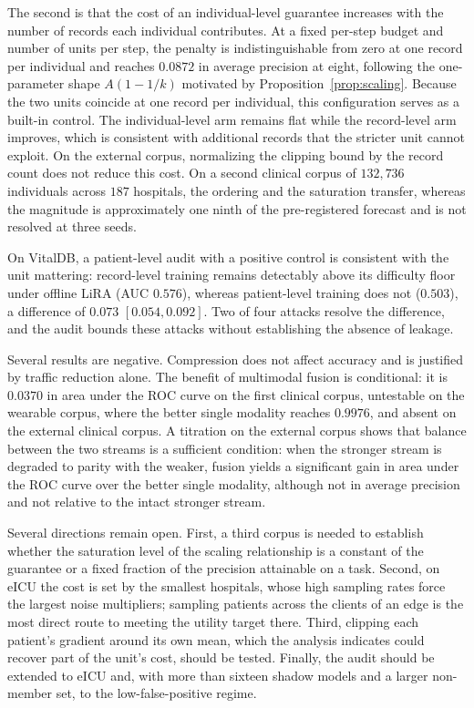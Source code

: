 The second is that the cost of an individual-level guarantee increases with the number of
records each individual contributes. At a fixed per-step budget and number of
units per step, the penalty is indistinguishable from zero at one record per
individual and reaches $0.0872$ in average precision at eight, following the
one-parameter shape $A(1 - 1/k)$ motivated by Proposition~\ref{prop:scaling}. Because the two units coincide at one record per
individual, this configuration serves as a built-in control. The
individual-level arm remains flat while the record-level arm improves, which is
consistent with additional records that the stricter unit cannot exploit.
On the external corpus, normalizing the clipping bound by the record count
does not reduce this cost. On a second clinical corpus of $132{,}736$ individuals across $187$
hospitals, the ordering and the saturation transfer, whereas the magnitude is
approximately one ninth of the pre-registered forecast and is not resolved at
three seeds.

On VitalDB, a patient-level audit with a positive control is consistent with
the unit mattering: record-level training remains detectably above its
difficulty floor under offline LiRA (AUC $0.576$), whereas patient-level
training does not ($0.503$), a difference of $0.073$ $[0.054, 0.092]$. Two of
four attacks resolve the difference, and the audit bounds these attacks
without establishing the absence of leakage.

Several results are negative. Compression does not affect accuracy and is
justified by traffic reduction alone. The benefit of multimodal fusion is
conditional: it is $0.0370$ in area under the ROC curve on the first clinical
corpus, untestable on the wearable corpus, where the better single modality
reaches $0.9976$, and absent on the external clinical corpus. A titration on
the external corpus shows that balance between the two streams is a sufficient
condition: when the stronger stream is degraded to parity with the weaker,
fusion yields a significant gain in area under the ROC curve over the better
single modality, although not in average precision and not relative to the
intact stronger stream.

Several directions remain open. First, a third corpus is needed to
establish whether the saturation level of the scaling relationship is a constant of the
guarantee or a fixed fraction of the precision attainable on a task. Second,
on eICU the cost is set by the smallest hospitals, whose high sampling rates
force the largest noise multipliers; sampling patients across the clients of
an edge is the most direct route to meeting the utility target there. Third,
clipping each patient's gradient around its own mean, which the analysis
indicates could recover part of the unit's cost, should be tested. Finally, the
audit should be extended to eICU and, with more than sixteen shadow models and
a larger non-member set, to the low-false-positive regime.
